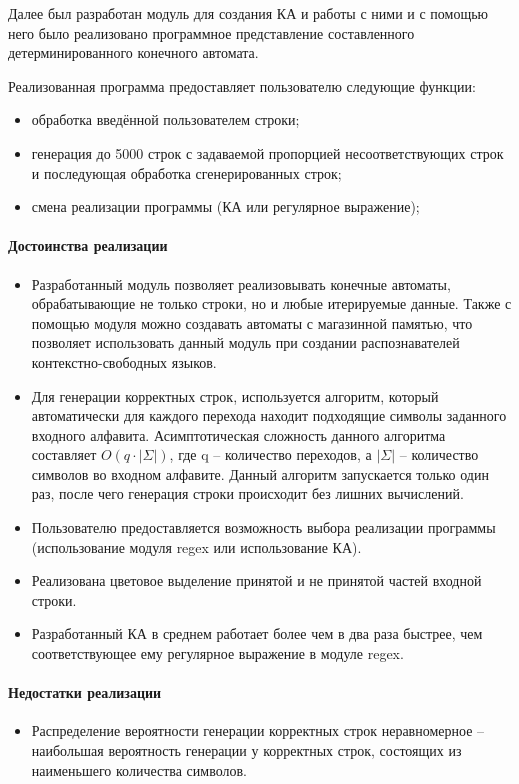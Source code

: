 \documentclass[a4paper,final]{article}
\begin{document}
Далее был разработан модуль для создания КА и работы с ними и с помощью него было реализовано программное представление составленного детерминированного конечного автомата.

Реализованная программа предоставляет пользователю следующие функции:
\begin{itemize}
    \item обработка введённой пользователем строки;
    \item генерация до 5000 строк с задаваемой пропорцией несоответствующих строк и последующая обработка сгенерированных строк;
    \item смена реализации программы (КА или регулярное выражение);
\end{itemize}

\paragraph{Достоинства реализации}
\begin{itemize}
    \item Разработанный модуль позволяет реализовывать конечные автоматы, обрабатывающие не только строки, но и любые итерируемые данные. Также с помощью модуля можно создавать автоматы с магазинной памятью, что позволяет использовать данный модуль при создании распознавателей контекстно-свободных языков.
    \item Для генерации корректных строк, используется алгоритм, который автоматически для каждого перехода находит подходящие символы заданного входного алфавита. Асимптотическая сложность данного алгоритма составляет $O(q \cdot |\Sigma|)$, где q -- количество переходов, а $|\Sigma|$ -- количество символов во входном алфавите. Данный алгоритм запускается только один раз, после чего генерация строки происходит без лишних вычислений.
    \item Пользователю предоставляется возможность выбора реализации программы (использование модуля regex или использование КА).
    \item Реализована цветовое выделение принятой и не принятой частей входной строки.
    \item Разработанный КА в среднем работает более чем в два раза быстрее, чем соответствующее ему регулярное выражение в модуле regex.
\end{itemize}
\paragraph{Недостатки реализации}
\begin{itemize}
    \item Распределение вероятности генерации корректных строк неравномерное -- наибольшая вероятность генерации у корректных строк, состоящих из наименьшего количества символов.
\end{itemize}
\end{document}
